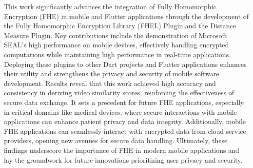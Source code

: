 This work significantly advances the integration of Fully Homomorphic Encryption (FHE) in mobile and Flutter applications through the development of the Fully Homomorphic Encryption Library (FHEL) Plugin and the Distance Measure Plugin. Key contributions include the demonstration of Microsoft SEAL's high performance on mobile devices, effectively handling encrypted computations while maintaining high performance in real-time applications. Deploying these plugins to other Dart projects and Flutter applications enhances their utility and strengthens the privacy and security of mobile software development.
Results reveal that this work achieved high accuracy and consistency in deriving video similarity scores, reinforcing the effectiveness of secure data exchange. It sets a precedent for future FHE applications, especially in critical domains like medical devices, where secure interactions with mobile applications can enhance patient privacy and data integrity. Additionally, mobile FHE applications can seamlessly interact with encrypted data from cloud service providers, opening new avenues for secure data handling. Ultimately, these findings underscore the importance of FHE in modern mobile applications and lay the groundwork for future innovations prioritizing user privacy and security.
